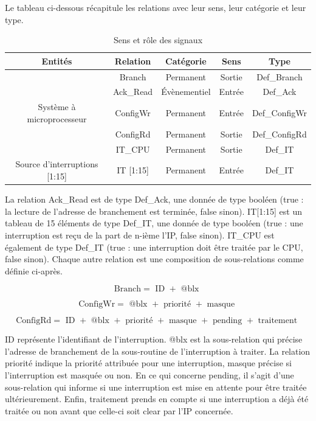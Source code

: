 Le tableau ci-dessous récapitule les relations avec leur sens, leur catégorie et leur type.

\begin{table}[H]
	\centering
	\begin{tabular}{|c|c|c|c|c|}
		\hline
		Entités & Relation & Catégorie & Sens & Type\\
		\hline
		& Branch & Permanent & Sortie & Def\_Branch \\
		& Ack\_Read & Évènementiel & Entrée & Def\_Ack \\
		Système à microprocesseur & ConfigWr & Permanent & Entrée & Def\_ConfigWr \\
		& ConfigRd & Permanent & Sortie & Def\_ConfigRd \\
		& IT\_CPU & Permanent & Sortie & Def\_IT\\
		\hline
		Source d'interruptions [1:15] & IT [1:15] & Permanent & Entrée & Def\_IT\\
		\hline
	\end{tabular}
	\caption{Sens et rôle des signaux}
	\label{tab:entrees_sorties_composant}
\end{table}

La relation Ack\_Read est de type Def\_Ack, une donnée de type booléen (true : la lecture de l'adresse de branchement est terminée, false sinon).
IT[1:15] est un tableau de 15 éléments de type Def\_IT, une donnée de type booléen (true : une interruption est reçu de la part de n-ième l'IP, false sinon).
IT\_CPU est également de type Def\_IT (true : une interruption doit être traitée par le CPU, false sinon).
Chaque autre relation est une composition de sous-relations comme définie ci-après.

\begin{equation*}
\mbox{Branch} = \mbox{ ID } + \mbox{ @blx }
\end{equation*}

\begin{equation*}
\mbox{ConfigWr} = \mbox{ @blx } + \mbox{ priorité } + \mbox{ masque }
\end{equation*}

\begin{equation*}
\mbox{ConfigRd} = \mbox{ ID } + \mbox{ @blx } + \mbox{ priorité } + \mbox{ masque } + \mbox{ pending } + \mbox{ traitement }
\end{equation*}

ID représente l'identifiant de l'interruption.
@blx est la sous-relation qui précise l'adresse de branchement de la sous-routine de l'interruption à traiter.
La relation priorité indique la priorité attribuée pour une interruption, masque précise si l'interruption est masquée ou non.
En ce qui concerne pending, il s'agit d'une sous-relation qui informe si une interruption est mise en attente pour être traitée ultérieurement.
Enfin, traitement prends en compte si une interruption a déjà été traitée ou non avant que celle-ci soit clear par l'IP concernée.

